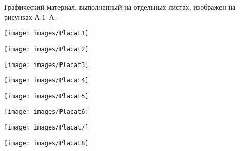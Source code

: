 
Графический материал, выполненный на отдельных листах,
изображен на рисунках А.1--А..
\setcounter{числоПлакатов}{0}

\renewcommand{\thefigure}{А.\arabic{figure}} %

\begin{landscape}

\begin{плакат}
	\texttt{[image: images/Placat1]}
	\label{pl1:placat1}
\end{плакат}

\begin{плакат}
	\texttt{[image: images/Placat2]}
	\label{pl1:placat2}
\end{плакат}

\begin{плакат}
	\texttt{[image: images/Placat3]}
	\label{pl1:placat3}
\end{плакат}

\begin{плакат}
	\texttt{[image: images/Placat4]}
	\label{pl1:placat4}
\end{плакат}

\begin{плакат}
	\texttt{[image: images/Placat5]}
	\label{pl1:placat5}
\end{плакат}

\begin{плакат}
	\texttt{[image: images/Placat6]}
	\label{pl1:placat6}
\end{плакат}

\begin{плакат}
	\texttt{[image: images/Placat7]}
	\label{pl1:placat7}
\end{плакат}

\begin{плакат}
	\texttt{[image: images/Placat8]}
	\label{pl1:placat8}
\end{плакат}

\end{landscape}
